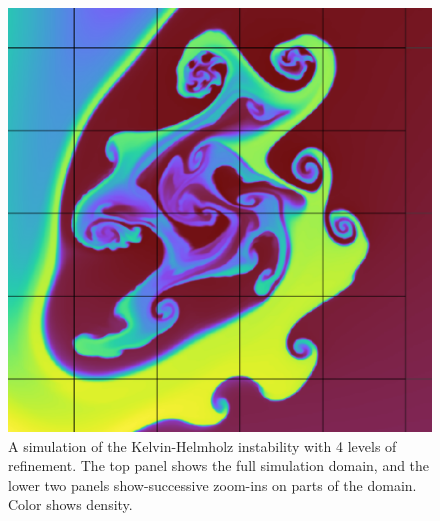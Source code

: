 \documentclass[fleqn,usenatbib]{mnras}
\begin{document}
\begin{figure}
\begin{center}
    \includegraphics[width=0.85\columnwidth]{quokka_zoom2.pdf}
    \end{center}
    \caption{A simulation of the Kelvin-Helmholz instability with 4 levels of refinement. The top panel shows the full simulation domain, and the lower two panels show-successive zoom-ins on parts of the domain. Color shows density.}
    \label{fig:kh_zoom}
\end{figure}
\end{document}
